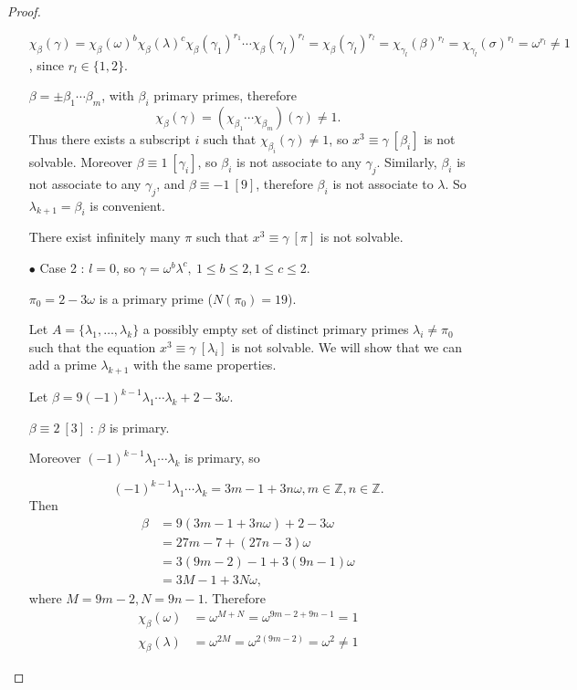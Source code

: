 \documentclass[11pt,a4paper]{article}
\begin{document}
\begin{proof}
\begin{enumerate}
$\chi_\beta(\gamma) =\chi_\beta(\omega)^b \chi_\beta(\lambda)^c\chi_\beta(\gamma_1)^{r_1}\cdots\chi_\beta(\gamma_l)^{r_l} = \chi_{\beta}(\gamma_l)^{r_l} = \chi_{\gamma_l}(\beta)^{r_l} = \chi_{\gamma_l}(\sigma)^{r_l} = \omega^{r_l}  \neq 1$, since $r_l \in \{1,2\}$. 

$\beta = \pm \beta_1\cdots \beta_m$, with $\beta_i$ primary primes, therefore
$$\chi_\beta(\gamma) = (\chi_{\beta_1}\cdots \chi_{\beta_m})(\gamma) \neq 1. $$ Thus there exists a subscript $i$ such that $\chi_{\beta_i}(\gamma) \ne 1$, so $x^3 \equiv \gamma\ [\beta_i]$ is not solvable. Moreover $\beta \equiv 1 \ [\gamma_i]$, so $\beta_i$ is not associate to any $\gamma_j$. Similarly, $\beta_i$ is not associate to any $\gamma_j$, and $\beta \equiv -1\ [9]$, therefore $\beta_i$ is not associate to $\lambda$. So $\lambda_{k+1} = \beta_i$ is convenient.

There exist infinitely many $\pi$ such that $x^3 \equiv \gamma \ [\pi]$ is not solvable.


\item[$\bullet$] Case 2 : $l = 0$, so $\gamma = \omega^b\lambda^c,\ 1\leq b \leq 2, 1 \leq c \leq 2$.

$\pi_0 = 2 - 3 \omega$ is a primary prime ($N(\pi_0) = 19$).

Let $A = \{\lambda_1,\ldots,\lambda_k\}$ a possibly empty set of distinct primary primes $\lambda_i \neq \pi_0$ such that the equation $x^3 \equiv \gamma \ [\lambda_i]$ is not solvable. We will show that we can add a prime $\lambda_{k+1}$ with the same properties.

Let $\beta = 9 (-1)^{k-1} \lambda_1\cdots \lambda_k + 2-3\omega$.

$\beta\equiv 2 \ [3]$ : $\beta$ is primary.

Moreover $(-1)^{k-1} \lambda_1\cdots \lambda_k $ is primary, so 

$$(-1)^{k-1} \lambda_1\cdots \lambda_k  = 3m-1+3n\omega, m \in \mathbb{Z},n\in \mathbb{Z}.$$
Then
\begin{align*}
\beta&=9(3m-1+3n\omega)+2-3\omega\\
&=27m-7+(27n-3)\omega\\
&=3(9m-2)-1+3(9n-1)\omega\\
&=3M-1+3N\omega,
\end{align*}
where $M=9m-2,N=9n-1$.
Therefore
\begin{align*}
\chi_\beta(\omega) &= \omega^{M+N} = \omega^{9m-2+9n-1}=1\\
\chi_\beta(\lambda) &=\omega^{2M} = \omega^{2(9m-2)}=\omega^2\neq 1
\end{align*}


\end{enumerate}
\end{proof}
\end{document}
